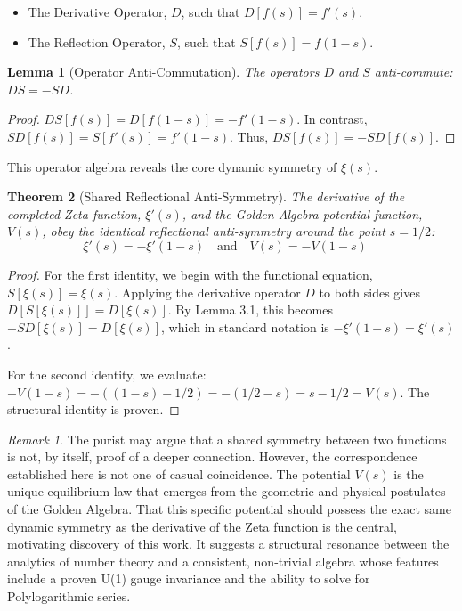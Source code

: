 \documentclass{article}
\theoremstyle{plain}
\newtheorem{theorem}{Theorem}[section]
\newtheorem{lemma}[theorem]{Lemma}
\theoremstyle{definition}
\theoremstyle{remark}
\newtheorem*{remark}{Remark}
\begin{document}
\begin{itemize}
    \item The Derivative Operator, $D$, such that $D[f(s)] = f'(s)$.
    \item The Reflection Operator, $S$, such that $S[f(s)] = f(1-s)$.
\end{itemize}

\begin{lemma}[Operator Anti-Commutation]
The operators $D$ and $S$ anti-commute: $DS = -SD$.
\end{lemma}
\begin{proof}
$DS[f(s)] = D[f(1-s)] = -f'(1-s)$. In contrast, $SD[f(s)] = S[f'(s)] = f'(1-s)$. Thus, $DS[f(s)] = -SD[f(s)]$.
\end{proof}

This operator algebra reveals the core dynamic symmetry of $\xi(s)$.

\begin{theorem}[Shared Reflectional Anti-Symmetry]
The derivative of the completed Zeta function, $\xi'(s)$, and the Golden Algebra potential function, $V(s)$, obey the identical reflectional anti-symmetry around the point $s=1/2$:
$$ \xi'(s) = -\xi'(1-s) \quad \text{and} \quad V(s) = -V(1-s) \quad \text{}$$
\end{theorem}
\begin{proof}
For the first identity, we begin with the functional equation, $S[\xi(s)] = \xi(s)$. Applying the derivative operator $D$ to both sides gives $D[S[\xi(s)]] = D[\xi(s)]$. By Lemma 3.1, this becomes $-SD[\xi(s)] = D[\xi(s)]$, which in standard notation is $-\xi'(1-s) = \xi'(s)$.

For the second identity, we evaluate: $-V(1-s) = -((1-s) - 1/2) = -(1/2 - s) = s - 1/2 = V(s)$. The structural identity is proven.
\end{proof}

\begin{remark}
The purist may argue that a shared symmetry between two functions is not, by itself, proof of a deeper connection. However, the correspondence established here is not one of casual coincidence. The potential $V(s)$ is the unique equilibrium law that emerges from the geometric and physical postulates of the Golden Algebra. That this specific potential should possess the exact same dynamic symmetry as the derivative of the Zeta function is the central, motivating discovery of this work. It suggests a structural resonance between the analytics of number theory and a consistent, non-trivial algebra whose features include a proven U(1) gauge invariance and the ability to solve for Polylogarithmic series.
\end{remark}
\end{document}

